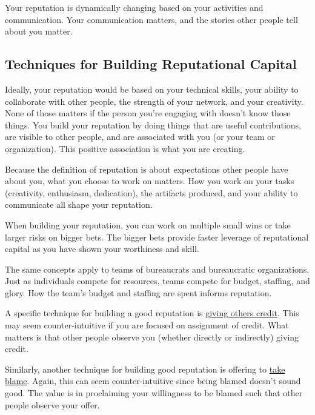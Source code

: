 Your reputation is dynamically changing based on your activities and communication. Your communication matters, and the stories other people tell about you matter.

\subsection*{Techniques for Building Reputational Capital}

Ideally, your reputation would be based on your technical skills, your ability to collaborate with other people, the strength of your network, and your creativity. None of those matters if the person you're engaging with doesn't know those things. 
You build your reputation by doing things that are useful contributions, are visible to other people, and are associated with you (or your team or organization). This positive association is what you are creating.

Because the definition of reputation is about expectations other people have about you, what you choose to work on matters. How you work on your tasks (creativity, enthusiasm, dedication), the artifacts produced, and your ability to communicate all shape your reputation. 

When building your reputation, you can work on multiple small wins or take larger risks on bigger bets. The bigger bets provide faster leverage of reputational capital as you have shown your worthiness and skill. 

The same concepts apply to teams of bureaucrats and bureaucratic organizations. Just as individuals compete for resources, teams compete for budget, staffing, and glory. How the team's budget and staffing are spent informs reputation. 

A specific technique for building a good reputation is 
\hyperref[sec:credit-others]{giving others credit}. 
%
%
This may seem counter-intuitive if you are focused on assignment of credit. What  matters is that other people observe you (whether directly or indirectly) giving credit. 

Similarly, another technique for building good reputation is offering to \hyperref[sec:take-blame]{take blame}.
%
%
Again, this can seem counter-intuitive since being blamed doesn't sound good. The value is in proclaiming your willingness to be blamed such that other people observe your offer. 

